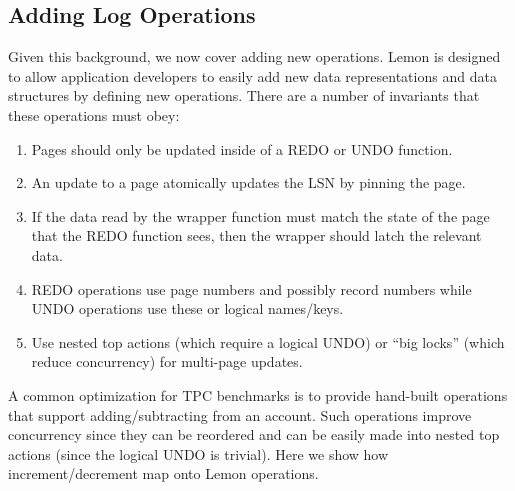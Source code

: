 \documentclass[10pt,letterpaper,twocolumn,english]{article}
\newcommand{\yad}{Lemon\xspace}
\begin{document}
\subsection{Adding Log Operations}
\label{op-def}


Given this background, we now cover adding new operations. \yad is
designed to allow application developers to easily add new data
representations and data structures by defining new operations.
There are a number of invariants that these operations must obey:
\begin{enumerate}
\item Pages should only be updated inside of a REDO or UNDO function.
\item An update to a page atomically updates the LSN by pinning the page.
\item If the data read by the wrapper function must match the state of
the page that the REDO function sees, then the wrapper should latch
the relevant data.
\item REDO operations use page numbers and possibly record numbers
while UNDO operations use these or logical names/keys.
\item Use nested top actions (which require a logical UNDO) 
or ``big locks'' (which reduce concurrency) for multi-page updates.
\end{enumerate}


A common optimization for TPC benchmarks is to provide hand-built
operations that support adding/subtracting from an account.  Such
operations improve concurrency since they can be reordered and can be
easily made into nested top actions (since the logical UNDO is
trivial). Here we show how increment/decrement map onto \yad operations.
\end{document}
